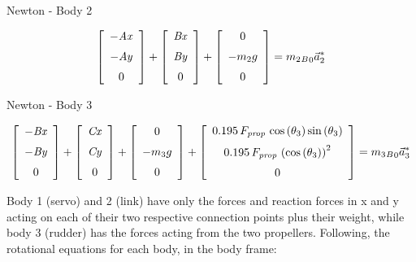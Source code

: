 Newton - Body 2

\begin{equation}\label{axbx}
  \left[ \begin {array}{c} {\it -Ax}\\ \noalign{\medskip}{\it -Ay}
\\ \noalign{\medskip}0\end {array} \right] 
+
 \left[ \begin {array}{c} {\it Bx}\\ \noalign{\medskip}{\it By}
\\ \noalign{\medskip}0\end {array} \right] 
+
 \left[ \begin {array}{c} 0\\ \noalign{\medskip}-m_{{2}}g
\\ \noalign{\medskip}0\end {array} \right] 
= {m}_{2} {_B}_{0}\vec{a}_{2}^*
\end{equation}

Newton - Body 3

\begin{equation}\label{bxcx}
  \left[ \begin {array}{c} {\it -Bx}\\ \noalign{\medskip}{\it -By}
\\ \noalign{\medskip}0\end {array} \right] 
+
 \left[ \begin {array}{c} {\it Cx}\\ \noalign{\medskip}{\it Cy}
\\ \noalign{\medskip}0\end {array} \right] 
+
 \left[ \begin {array}{c} 0\\ \noalign{\medskip}-m_{{3}}g
\\ \noalign{\medskip}0\end {array} \right] 
+
 \left[ \begin {array}{c}  0.195\,F_{{\it prop}}\,\cos \left( \theta_{
3} \right) \sin \left( \theta_{3} \right) \\ \noalign{\medskip} 0.195
\,F_{{\it prop}}\, \left( \cos \left( \theta_{3} \right)  \right) ^{2}
\\ \noalign{\medskip}0\end {array} \right] 
= {m}_{3} {_B}_{0}\vec{a}_{3}^*
\end{equation}

Body 1 (servo) and 2 (link) have only the forces and reaction forces in x and y acting on each of their two respective connection points plus their weight, while body 3 (rudder) has the forces acting from the two propellers. 
Following, the rotational equations for each body, in the body frame:

